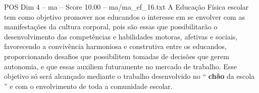\begin{textsample}{POS Dim 4 – ma – Score 10.00 – ma/ma\_ef\_16.txt}
A Educação Física escolar tem como objetivo promover nos educandos o interesse em se envolver com as manifestações da cultura corporal, pois são essas que possibilitarão o desenvolvimento das competências e habilidades motoras, afetivas e sociais, favorecendo a convivência harmoniosa e construtiva entre os educandos, proporcionando desafios que possibilitem tomadas de decisões que gerem autonomia, e que essas auxiliem futuramente no mercado de trabalho.
Esse objetivo só será alcançado mediante o trabalho desenvolvido no “ \textbf{chão} da escola ” e com o envolvimento de toda a comunidade escolar.

\end{textsample}
